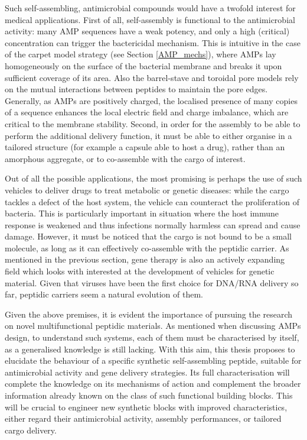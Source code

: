 Such self-assembling, antimicrobial compounds would have a twofold interest for medical applications.
%
First of all, self-assembly is functional to the antimicrobial activity: many AMP sequences have a weak potency, and only a high (critical) concentration can trigger the bactericidal mechanism. This is intuitive in the case of the carpet model strategy (see Section \ref{AMP_mechs}), where AMPs lay homogeneously on the surface of the bacterial membrane and breaks it upon sufficient coverage of its area. Also the barrel-stave and toroidal pore models rely on the mutual interactions between peptides to maintain the pore edges.
%
Generally, as AMPs are positively charged, the localised presence of many copies of a sequence enhances the local electric field and charge imbalance, which are critical to the membrane stability. 
%
Second, in order for the assembly to be able to perform the additional delivery function, it must be able to either organise in a tailored structure (for example a capsule able to host a drug), rather than an amorphous aggregate, or to co-assemble with the cargo of interest.

Out of all the possible applications, the most promising is perhaps the use of such vehicles to deliver drugs to treat metabolic or genetic diseases: while the cargo tackles a defect of the host system, the vehicle can counteract the proliferation of bacteria. This is particularly important in situation where the host immune response is weakened and thus infections normally harmless can spread and cause damage.
%
However, it must be noticed that the cargo is not bound to be a small molecule, as long as it can effectively co-assemble with the peptidic carrier. As mentioned in the previous section, gene therapy is also an actively expanding field which looks with interested at the development of vehicles for genetic material. Given that viruses have been the first choice for DNA/RNA delivery so far, peptidic carriers seem a natural evolution of them.

\bigskip
Given the above premises, it is evident the importance of pursuing the research on novel multifunctional peptidic materials.
As mentioned when discussing AMPs design, to understand such systems, each of them must be characterised by itself, as a generalised knowledge is still lacking.
With this aim, this thesis proposes to elucidate the behaviour of a specific synthetic self-assembling peptide, suitable for antimicrobial activity and gene delivery strategies. Its full characterisation will complete the knowledge on its mechanisms of action and complement the broader information already known on the class of such functional building blocks. This will be crucial to engineer new synthetic blocks with improved characteristics, either regard their antimicrobial activity, assembly performances, or tailored cargo delivery.


